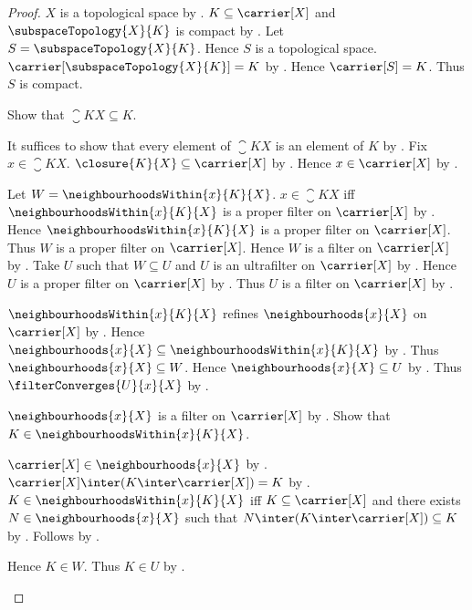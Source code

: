 \begin{proof}
    $X$ is a topological space by .
    $K\subseteq\carrier[X]$ and
        $\subspaceTopology{X}{K}$ is compact by .
    Let $S=\subspaceTopology{X}{K}$.
    Hence $S$ is a topological space.
    $\carrier[\subspaceTopology{X}{K}]=K$ by
        .
    Hence $\carrier[S]=K$.
    Thus $S$ is compact.

    Show that $\closure{K}{X}\subseteq K$.
    \begin{subproof}
        It suffices to show that every element of $\closure{K}{X}$ is an
            element of $K$ by .
        Fix $x\in\closure{K}{X}$.
        $\closure{K}{X}\subseteq\carrier[X]$ by
            .
        Hence $x\in\carrier[X]$ by .

        Let $W=\neighbourhoodsWithin{x}{K}{X}$.
        $x\in\closure{K}{X}$ iff
            $\neighbourhoodsWithin{x}{K}{X}$ is a proper filter on
            $\carrier[X]$ by
            .
        Hence $\neighbourhoodsWithin{x}{K}{X}$ is a proper filter on
            $\carrier[X]$.
        Thus $W$ is a proper filter on $\carrier[X]$.
        Hence $W$ is a filter on $\carrier[X]$ by
            .
        Take $U$ such that $W\subseteq U$ and
            $U$ is an ultrafilter on $\carrier[X]$ by
            .
        Hence $U$ is a proper filter on $\carrier[X]$ by
            .
        Thus $U$ is a filter on $\carrier[X]$ by
            .

        $\neighbourhoodsWithin{x}{K}{X}$ refines
            $\neighbourhoods{x}{X}$ on $\carrier[X]$ by
            .
        Hence $\neighbourhoods{x}{X}\subseteq
            \neighbourhoodsWithin{x}{K}{X}$ by
            .
        Thus $\neighbourhoods{x}{X}\subseteq W$.
        Hence $\neighbourhoods{x}{X}\subseteq U$ by
            .
        Thus $\filterConverges{U}{x}{X}$ by
            .

        $\neighbourhoods{x}{X}$ is a filter on $\carrier[X]$ by
            .
        Show that $K\in\neighbourhoodsWithin{x}{K}{X}$.
        \begin{subproof}
            $\carrier[X]\in\neighbourhoods{x}{X}$ by
                .
            $\carrier[X]\inter(K\inter\carrier[X])=K$ by
                .
            $K\in\neighbourhoodsWithin{x}{K}{X}$ iff
                $K\subseteq\carrier[X]$ and there exists
                $N\in\neighbourhoods{x}{X}$ such that
                $N\inter(K\inter\carrier[X])\subseteq K$ by
                .
            Follows by .
        \end{subproof}
        Hence $K\in W$.
        Thus $K\in U$ by .


\end{subproof}
\end{proof}
